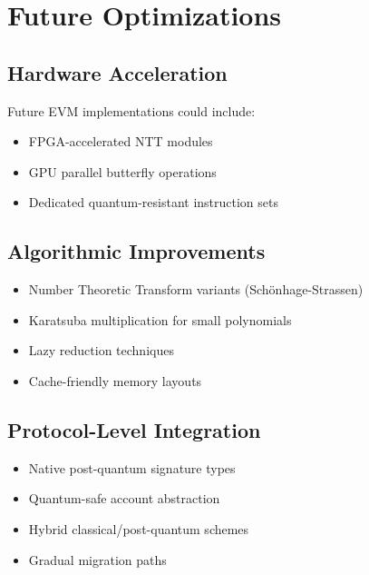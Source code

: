 \section{Future Optimizations}


\subsection{Hardware Acceleration}

Future EVM implementations could include:
\begin{itemize}
\item FPGA-accelerated NTT modules
\item GPU parallel butterfly operations
\item Dedicated quantum-resistant instruction sets
\end{itemize}

\subsection{Algorithmic Improvements}

\begin{itemize}
\item Number Theoretic Transform variants (Schönhage-Strassen)
\item Karatsuba multiplication for small polynomials
\item Lazy reduction techniques
\item Cache-friendly memory layouts
\end{itemize}

\subsection{Protocol-Level Integration}

\begin{itemize}
\item Native post-quantum signature types
\item Quantum-safe account abstraction
\item Hybrid classical/post-quantum schemes
\item Gradual migration paths
\end{itemize}

